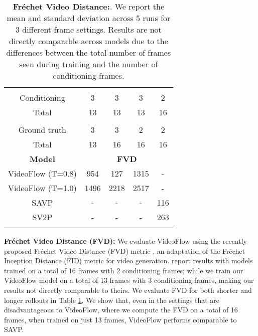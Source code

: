 \documentclass{article} \usepackage{iclr2020_conference,times}
\begin{document}
\begin{table}[h!]
\centering
\begin{tabular}{  c  c  c  c  c }
\hline
\addlinespace[0.05cm]
\multicolumn{5}{c}{\textbf{\# Frames Seen: Training}} \\
\addlinespace[0.05cm]
\hline\hline
\addlinespace[0.05cm]
Conditioning & 3 & 3 & 3 & 2 \\
Total & 13 & 13 & 13 & 16 \\
\addlinespace[0.05cm]
\hline
\addlinespace[0.05cm]
\multicolumn{5}{c}{\textbf{\# Frames: Evaluation}} \\
\addlinespace[0.05cm]
\hline\hline
\addlinespace[0.05cm]
Ground truth & 3 & 3 & 2 & 2 \\
Total & 13 & 16 & 16 & 16 \\
\addlinespace[0.05cm]
\hline
 \addlinespace[0.05cm]
 \textbf{Model} & \multicolumn{4}{|c}{\textbf{FVD}} \\
 \addlinespace[0.05cm]
 \hline\hline
 \addlinespace[0.05cm]
 VideoFlow (T=0.8) & 954 & 127  & 1315 & - \\
 VideoFlow (T=1.0) & 1496 & 2218 & 2517 & - \\
SAVP & - & - & - & 116 \\
SV2P & - & - & - &  263 \\
\addlinespace[0.05cm]
\hline
\addlinespace[0.05cm]
\end{tabular}
\caption{\textbf{Fr\'{e}chet Video Distance:}. We report the mean and standard deviation across 5 runs for 3 different frame settings. Results are not directly comparable across models due to the differences between the total number of frames seen during training and the number of conditioning frames.}
\label{table:fvd}
\end{table}

\textbf{Fr\'{e}chet Video Distance (FVD):} We evaluate VideoFlow using the recently proposed Fr\'{e}chet Video Distance (FVD) metric \citep{unterthiner2018accurate}, an adaptation of the  Fr\'{e}chet Inception Distance (FID) metric \citep{heusel2017gans} for video generation. \citep{unterthiner2018accurate} report results with models trained on a total of 16 frames with 2 conditioning frames; while we train our VideoFlow model on a total of 13 frames with 3 conditioning frames, making our results not directly comparable to theirs. We evaluate FVD for both shorter and longer rollouts in Table \ref{table:fvd}. We show that, even in the settings that are disadvantageous to VideoFlow, where we compute the FVD on a total of 16 frames, when trained on just 13 frames, VideoFlow performs comparable to SAVP.
\end{document}
